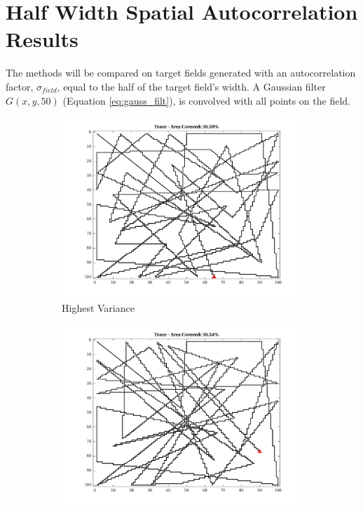 \FloatBarrier
\clearpage

\section{Half Width Spatial Autocorrelation Results}
The methods will be compared on target fields generated with an autocorrelation factor, $\sigma_{field}$, equal to the half of the target field's width. A Gaussian filter $G(x,y,50)$ (Equation \ref{eq:gauss_filt}), is convolved with all points on the field.

\begin{figure}[htb!]
    \centering
    \begin{subfigure}[t]{0.3333\textwidth}
        \centering
        \includegraphics[width=\linewidth]{figures/hbresults/path_nhv_30p_100x100_sf_50_seed_2.png}
        \captionsetup{skip=0.20\baselineskip,size=footnotesize}
        \caption{Highest Variance}
    \end{subfigure}%
    \begin{subfigure}[t]{0.3333\textwidth}
        \centering
        \includegraphics[width=\linewidth]{figures/hbresults/path_nnhv_30p_100x100_sf_50_seed_2.png}

\end{subfigure}
\end{figure}
